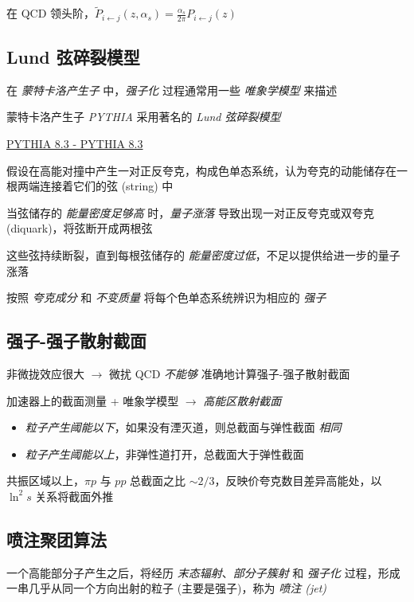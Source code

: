\documentclass[oneside,a4paper,openany,11pt]{ctexbook}
\begin{document}
在 QCD 领头阶，$\tilde{P}_{i \gets j} (z, \alpha_s) = \frac{\alpha_s}{2\pi} P_{i \gets j} (z)$

\subsection{Lund 弦碎裂模型}

在 \emph{蒙特卡洛产生子} 中，\emph{强子化} 过程通常用一些 \emph{唯象学模型} 来描述

蒙特卡洛产生子 \emph{PYTHIA} 采用著名的 \emph{Lund 弦碎裂模型}

\href{https://pythia.org/}{PYTHIA 8.3 - PYTHIA 8.3}

假设在高能对撞中产生一对正反夸克，构成色单态系统，认为夸克的动能储存在一根两端连接着它们的弦 (string) 中

当弦储存的 \emph{能量密度足够高} 时，\emph{量子涨落} 导致出现一对正反夸克或双夸克 (diquark)，将弦断开成两根弦

这些弦持续断裂，直到每根弦储存的 \emph{能量密度过低}，不足以提供给进一步的量子涨落

按照 \emph{夸克成分} 和 \emph{不变质量} 将每个色单态系统辨识为相应的 \emph{强子}

\subsection{强子-强子散射截面}

非微拢效应很大 $\to$ 微扰 QCD \emph{不能够} 准确地计算强子-强子散射截面

加速器上的截面测量 + 唯象学模型 $\to$ \emph{高能区散射截面}

\begin{itemize}
    \item \emph{粒子产生阈能以下}，如果没有湮灭道，则总截面与弹性截面 \emph{相同}
    \item \emph{粒子产生阈能以上}，非弹性道打开，总截面大于弹性截面
\end{itemize}

共振区域以上，$\pi p$ 与 $pp$ 总截面之比 $\sim 2/3$，反映价夸克数目差异高能处，以 $\ln^2s$ 关系将截面外推

\subsection{喷注聚团算法}

一个高能部分子产生之后，将经历 \emph{末态辐射}、\emph{部分子簇射} 和 \emph{强子化} 过程，形成一串几乎从同一个方向出射的粒子 (主要是强子)，称为 \emph{喷注 (jet)}
\end{document}
